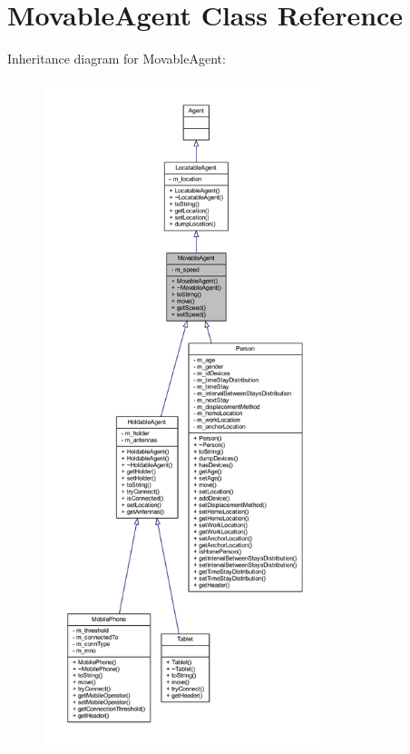 \hypertarget{class_movable_agent}{}\section{Movable\+Agent Class Reference}
\label{class_movable_agent}


Inheritance diagram for Movable\+Agent\+:\nopagebreak
\begin{figure}[H]
\begin{center}
\leavevmode
\includegraphics[height=550pt]{class_movable_agent__inherit__graph}
\end{center}
\end{figure}


